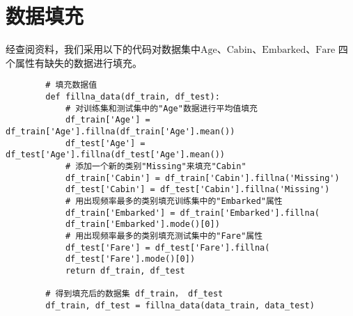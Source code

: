 \documentclass[AutoFakeBold]{LZUThesis}
\begin{document}
    \section{数据填充}
    经查阅资料，我们采用以下的代码对数据集中$\mathrm{Age}$、$\mathrm{Cabin}$、$\mathrm{Embarked}$、$\mathrm{Fare}$
    四个属性有缺失的数据进行填充。
    \begin{lstlisting}
        # 填充数据值
        def fillna_data(df_train, df_test):
            # 对训练集和测试集中的"Age"数据进行平均值填充
            df_train['Age'] = df_train['Age'].fillna(df_train['Age'].mean())
            df_test['Age'] = df_test['Age'].fillna(df_test['Age'].mean())
            # 添加一个新的类别"Missing"来填充"Cabin"
            df_train['Cabin'] = df_train['Cabin'].fillna('Missing')
            df_test['Cabin'] = df_test['Cabin'].fillna('Missing')
            # 用出现频率最多的类别填充训练集中的"Embarked"属性
            df_train['Embarked'] = df_train['Embarked'].fillna(
            df_train['Embarked'].mode()[0])
            # 用出现频率最多的类别填充测试集中的"Fare"属性
            df_test['Fare'] = df_test['Fare'].fillna(
            df_test['Fare'].mode()[0])
            return df_train, df_test
        
        # 得到填充后的数据集 df_train， df_test
        df_train, df_test = fillna_data(data_train, data_test)
    \end{lstlisting}
\end{document}

